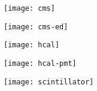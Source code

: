 \begin{frame}
    \begin{figure}
        \begin{centering}
            \texttt{[image: cms]}
        \end{centering}
    \end{figure}
\end{frame}
\begin{frame}
    \begin{figure}
        \begin{centering}
            \texttt{[image: cms-ed]}
        \end{centering}
    \end{figure}
\end{frame}
\begin{frame}
    \begin{figure}
        \begin{centering}
            \texttt{[image: hcal]}
        \end{centering}
    \end{figure}
\end{frame}
\begin{frame}
    \begin{figure}
        \begin{centering}
            \texttt{[image: hcal-pmt]}
        \end{centering}
    \end{figure}
\end{frame}
\begin{frame}
    \begin{figure}
        \begin{centering}
            \texttt{[image: scintillator]}
        \end{centering}
    \end{figure}
\end{frame}

